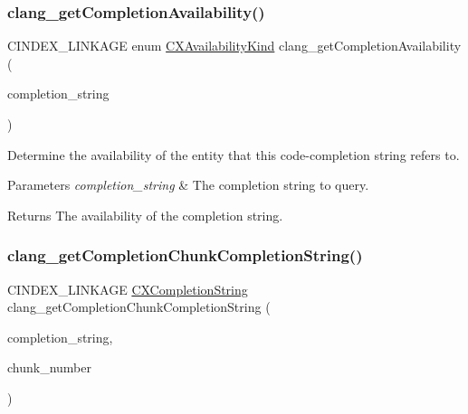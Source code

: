 \subsubsection{\texorpdfstring{clang\+\_\+get\+Completion\+Availability()}{clang\_getCompletionAvailability()}}
{\footnotesize\ttfamily C\+I\+N\+D\+E\+X\+\_\+\+L\+I\+N\+K\+A\+GE enum \mbox{\hyperlink{group__CINDEX_gada331ea0195e952c8f181ecf15e83d71}{C\+X\+Availability\+Kind}} clang\+\_\+get\+Completion\+Availability (\begin{DoxyParamCaption}\item[{\mbox{\hyperlink{group__CINDEX__CODE__COMPLET_gafea23a43a60ec3b4f3bedccfbb76883a}{C\+X\+Completion\+String}}}]{completion\+\_\+string }\end{DoxyParamCaption})}



Determine the availability of the entity that this code-\/completion string refers to. 


\begin{DoxyParams}{Parameters}
{\em completion\+\_\+string} & The completion string to query.\\
\hline
\end{DoxyParams}
\begin{DoxyReturn}{Returns}
The availability of the completion string. 
\end{DoxyReturn}
\mbox{\label{group__CINDEX__CODE__COMPLET_ga3063e36e81b3e14809f87bdc841a3a9d}} 
\subsubsection{\texorpdfstring{clang\+\_\+get\+Completion\+Chunk\+Completion\+String()}{clang\_getCompletionChunkCompletionString()}}
{\footnotesize\ttfamily C\+I\+N\+D\+E\+X\+\_\+\+L\+I\+N\+K\+A\+GE \mbox{\hyperlink{group__CINDEX__CODE__COMPLET_gafea23a43a60ec3b4f3bedccfbb76883a}{C\+X\+Completion\+String}} clang\+\_\+get\+Completion\+Chunk\+Completion\+String (\begin{DoxyParamCaption}\item[{\mbox{\hyperlink{group__CINDEX__CODE__COMPLET_gafea23a43a60ec3b4f3bedccfbb76883a}{C\+X\+Completion\+String}}}]{completion\+\_\+string,  }\item[{unsigned}]{chunk\+\_\+number }\end{DoxyParamCaption})}



